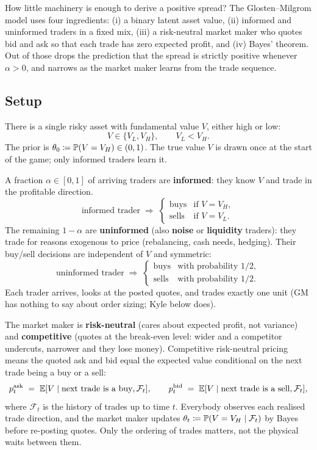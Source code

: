 How little machinery is enough to derive a positive spread? The
Glosten--Milgrom model uses four ingredients: (i) a binary latent
asset value, (ii) informed and uninformed traders in a fixed mix,
(iii) a risk-neutral market maker who quotes bid and ask so that
each trade has zero expected profit, and (iv) Bayes' theorem. Out
of those drops the prediction that the spread is strictly positive
whenever $\alpha > 0$, and narrows as the market maker learns from
the trade sequence.

\subsection{Setup}
\label{subsec:gm_setup}

There is a single risky asset with fundamental value $V$, either
high or low:
\[
  V \in \{V_L, V_H\}, \qquad V_L < V_H.
\]
The prior is $\theta_0 \coloneqq \mathbb{P}(V = V_H) \in (0, 1)$. The true
value $V$ is drawn once at the start of the game; only informed
traders learn it.

A fraction $\alpha \in [0, 1]$ of arriving traders are
\textbf{informed}: they know $V$ and trade in the profitable
direction.
\[
  \text{informed trader} \;\Longrightarrow\;
  \begin{cases}
    \text{buys}  & \text{if } V = V_H, \\
    \text{sells} & \text{if } V = V_L.
  \end{cases}
\]
The remaining $1 - \alpha$ are \textbf{uninformed} (also
\textbf{noise} or \textbf{liquidity} traders): they trade for reasons
exogenous to price (rebalancing, cash needs, hedging). Their
buy/sell decisions are independent of $V$ and symmetric:
\[
  \text{uninformed trader} \;\Longrightarrow\;
  \begin{cases}
    \text{buys}  & \text{with probability } 1/2, \\
    \text{sells} & \text{with probability } 1/2.
  \end{cases}
\]
Each trader arrives, looks at the posted quotes, and trades exactly
one unit (GM has nothing to say about order sizing; Kyle below
does).

The market maker is \textbf{risk-neutral} (cares about expected
profit, not variance) and \textbf{competitive} (quotes at the
break-even level: wider and a competitor undercuts, narrower and
they lose money). Competitive risk-neutral pricing means the quoted
ask and bid equal the expected value conditional on the next trade
being a buy or a sell:
\begin{equation}
  p^{\mathrm{ask}}_t \;=\; \mathbb{E}[V \mid \text{next trade is a buy}, \mathcal{F}_t],
  \qquad
  p^{\mathrm{bid}}_t \;=\; \mathbb{E}[V \mid \text{next trade is a sell}, \mathcal{F}_t],
  \label{eq:gm_quotes}
\end{equation}
where $\mathcal{F}_t$ is the history of trades up to time $t$.
Everybody observes each realised trade direction, and the market
maker updates $\theta_t \coloneqq \mathbb{P}(V = V_H \mid \mathcal{F}_t)$
by Bayes before re-posting quotes. Only the ordering of trades
matters, not the physical waits between them.


